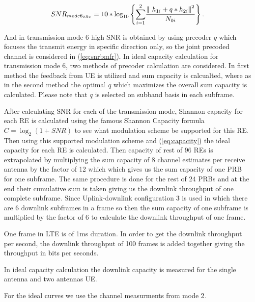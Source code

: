 \documentclass[a4paper,10pt]{article}
\begin{document}
\begin{equation} \label{eq:snrbmfr}
SNR_{mode6_{2Rx}} = 10* {\mathrm{log}}_{10} \left\lbrace {\sum_{i=1}^2} {\frac{{\| \ {h_{1i}} + q*{h_{2i}} \| \\}^2}{N_{0i}}}\right\rbrace. 
\end{equation}

And in transmission mode 6 high SNR is obtained by using precoder $q$ which focuses the transmit energy in specific direction only, so the joint precoded channel is considered in (\ref{eq:snrbmfr}). In ideal capacity calculation for transmission mode 6, two methods of precoder calculation are considered. In first method the feedback from UE is utilized and sum capacity is calcualted, where as in the second method the optimal $q$ which maximizes the overall sum capacity is calculated. Please note that $q$ is selected on subband basis in each subframe.


After calculating SNR for each of the transmission mode, Shannon capacity for each RE is calculated using the famous Shannon Capacity formula $C = \log_2(1 + SNR)$ to see what modulation scheme be supported for this RE. Then using this supported modulation scheme and (\ref{eq:capacity}) the ideal capacity for each RE is calculated.
\newline
Then capacity of rest of 96 REs is extrapolated by multiplying the sum capacity of 8 channel estimates per receive antenna by the factor of 12 which which gives us the sum capacity of one PRB for one subframe. The same procedure is done for the rest of 24 PRBs and at the end their cumulative sum is taken giving us the downlink throughput of one complete subframe. Since Uplink-downlink configuration 3 is used in which there are 6 downlink subframes in a frame so then the sum capacity of one subframe is multiplied by the factor of 6 to calculate the downlink throughput of one frame. 

One frame in LTE is of 1ms duration. In order to get the downlink throughput per second, the downlink throughput of 100 frames is added together giving the throughput in bits per seconds.

In ideal capacity calculation the downlink capacity is measured for the single antenna and two antennas UE.  

For the ideal curves we use the channel measurments from mode 2.
\end{document}
